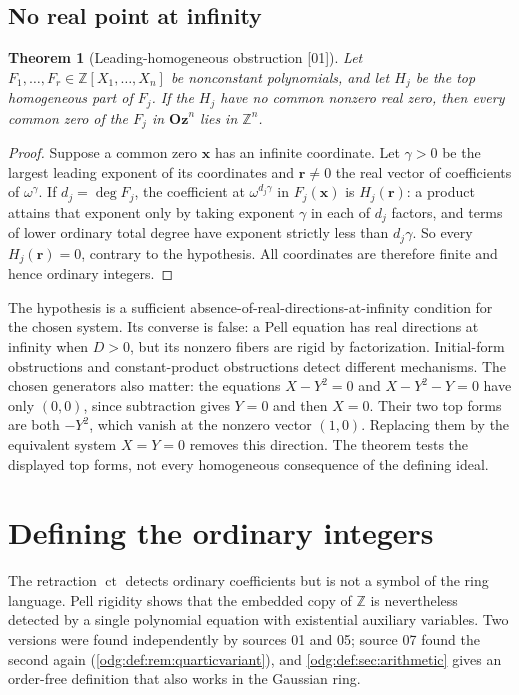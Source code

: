 \documentclass[11pt,oneside]{article}
\numberwithin{equation}{section}
\newtheorem{theorem}{Theorem}[section]
\theoremstyle{definition}
\theoremstyle{remark}
\newcommand{\Oz}{\mathbf{Oz}}
\newcommand{\Z}{\mathbb Z}
\newcommand{\ct}{\operatorname{ct}}
\newcommand{\src}[1]{\textup{\textsf{\small[#1]}}}
\begin{document}
\subsection{No real point at infinity}

\begin{theorem}[Leading-homogeneous obstruction \src{01}]\label{odg:thm:infinity}
Let $F_1,\ldots,F_r\in\Z[X_1,\ldots,X_n]$ be nonconstant polynomials,
and let $H_j$ be the top homogeneous part of $F_j$. If the $H_j$ have
no common nonzero real zero, then every common zero of the $F_j$ in
$\Oz^n$ lies in $\Z^n$.
\end{theorem}
\begin{proof}
Suppose a common zero $\mathbf x$ has an infinite coordinate. Let
$\gamma>0$ be the largest leading exponent of its coordinates and
$\mathbf r\ne0$ the real vector of coefficients of $\omega^\gamma$. If
$d_j=\deg F_j$, the coefficient at $\omega^{d_j\gamma}$ in $F_j(\mathbf x)$ is
$H_j(\mathbf r)$: a product attains that exponent only by taking exponent
$\gamma$ in each of $d_j$ factors, and terms of lower ordinary total degree
have exponent strictly less than $d_j\gamma$. So every $H_j(\mathbf r)=0$,
contrary to the hypothesis. All coordinates are therefore finite and hence
ordinary integers.
\end{proof}

The hypothesis is a sufficient absence-of-real-directions-at-infinity
condition for the chosen system. Its converse is false: a Pell equation has
real directions at infinity when $D>0$, but its nonzero fibers are rigid by
factorization. Initial-form obstructions and constant-product obstructions
detect different mechanisms. The chosen generators also matter: the equations
$X-Y^2=0$ and $X-Y^2-Y=0$ have only $(0,0)$, since subtraction gives $Y=0$
and then $X=0$. Their two top forms are both $-Y^2$, which vanish at the
nonzero vector $(1,0)$. Replacing them by the equivalent system $X=Y=0$
removes this direction. The theorem tests the displayed top forms, not every
homogeneous consequence of the defining ideal.

\section{Defining the ordinary integers}\label{odg:sec:guard}

The retraction $\ct$ detects ordinary coefficients but is not a symbol
of the ring language. Pell rigidity shows that the embedded copy of $\Z$ is
nevertheless detected by a single polynomial equation with existential
auxiliary variables. Two versions were found independently by sources 01 and
05; source 07 found the second again (\cref{odg:def:rem:quarticvariant}), and
\cref{odg:def:sec:arithmetic} gives an order-free definition that also works
in the Gaussian ring.
\end{document}
